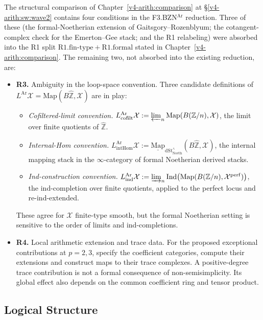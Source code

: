 The structural comparison of Chapter~\ref{v4-arith:comparison} at
\S\ref{v4-arith:sw:wave2} contains four conditions in the F3.BZN\({}^{\mathrm{Ar}}\)
reduction. Three of these (the formal-Noetherian
extension of Gaitsgory--Rozenblyum; the cotangent-complex check for
the Emerton--Gee stack; and the R1 relabeling) were absorbed into
the R1 split \(\mathrm{R1.fin\text{-}type}+\mathrm{R1.formal}\)
stated in Chapter~\ref{v4-arith:comparison}. The remaining two,
not absorbed into the existing reduction, are:
\begin{itemize}
\item \textbf{R3.} Ambiguity in the loop-space convention.
Three candidate definitions of
\(L^{\mathrm{Ar}}\mathcal{X}=\mathrm{Map}(B\widehat{\mathbb{Z}},\mathcal{X})\)
are in play:
\begin{itemize}
\item[\textbf{(a)}] \emph{Cofiltered-limit convention.}
\(L^{\mathrm{Ar}}_{\mathrm{cofilt}}\mathcal{X}:=\varprojlim_{n}\mathrm{Map}(B(\mathbb{Z}/n),\mathcal{X})\),
the limit over finite quotients of \(\widehat{\mathbb{Z}}\).
\item[\textbf{(b)}] \emph{Internal-Hom convention.}
\(L^{\mathrm{Ar}}_{\mathrm{intHom}}\mathcal{X}:=\underline{\mathrm{Map}}_{\mathrm{dSt}^{\wedge}_{\mathrm{Noeth}}}(B\widehat{\mathbb{Z}},\mathcal{X})\),
the internal mapping stack in the \(\infty\)-category of formal
Noetherian derived stacks.
\item[\textbf{(c)}] \emph{Ind-construction convention.}
\(L^{\mathrm{Ar}}_{\mathrm{ind}}\mathcal{X}:=\varinjlim_{n}\mathrm{Ind}\bigl(\mathrm{Map}(B(\mathbb{Z}/n),\mathcal{X}^{\mathrm{perf}})\bigr)\),
the ind-completion over finite quotients, applied to the perfect
locus and re-ind-extended.
\end{itemize}
These agree for \(\mathcal{X}\) finite-type smooth, but the formal
Noetherian setting is sensitive to the order of limits and
ind-completions.

\item \textbf{R4.} Local arithmetic extension and trace data.
For the proposed exceptional contributions at \(p=2,3\), specify
the coefficient categories, compute their extensions and construct
maps to their trace complexes. A positive-degree trace contribution
is not a formal consequence of non-semisimplicity. Its global effect
also depends on the common coefficient ring and tensor product.
\end{itemize}

\subsection{Logical Structure}

